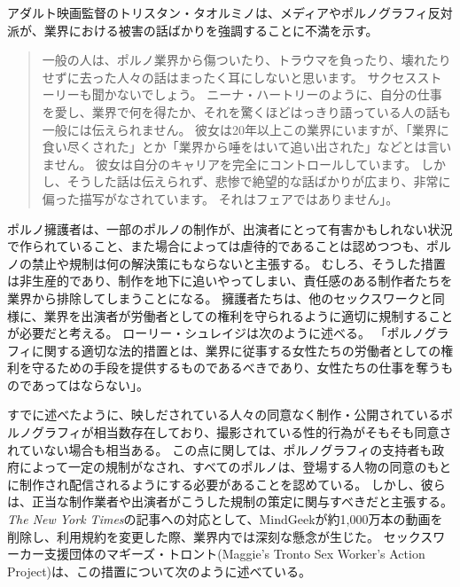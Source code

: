 \documentclass[paper=a4,book,openany]{jlreq}
\begin{document}
アダルト映画監督のトリスタン・タオルミノは、メディアやポルノグラフィ反対派が、業界における被害の話ばかりを強調することに不満を示す。

\begin{quote}
一般の人は、ポルノ業界から傷ついたり、トラウマを負ったり、壊れたりせずに去った人々の話はまったく耳にしないと思います。
サクセスストーリーも聞かないでしょう。
ニーナ・ハートリーのように、自分の仕事を愛し、業界で何を得たか、それを驚くほどはっきり語っている人の話も一般には伝えられません。
彼女は20年以上この業界にいますが、「業界に食い尽くされた」とか「業界から唾をはいて追い出された」などとは言いません。
彼女は自分のキャリアを完全にコントロールしています。
しかし、そうした話は伝えられず、悲惨で絶望的な話ばかりが広まり、非常に偏った描写がなされています。
それはフェアではありません」。
\citep{sachs12:_inter_femin_pornog}
\end{quote}

ポルノ擁護者は、一部のポルノの制作が、出演者にとって有害かもしれない状況で作られていること、また場合によっては虐待的であることは認めつつも、ポルノの禁止や規制は何の解決策にもならないと主張する。
むしろ、そうした措置は非生産的であり、制作を地下に追いやってしまい、責任感のある制作者たちを業界から排除してしまうことになる。
擁護者たちは、他のセックスワークと同様に、業界を出演者が労働者としての権利を守られるように適切に規制することが必要だと考える。
ローリー・シュレイジは次のように述べる。
「ポルノグラフィに関する適切な法的措置とは、業界に従事する女性たちの労働者としての権利を守るための手段を提供するものであるべきであり、女性たちの仕事を奪うものであってはならない」\citep[p.58]{shrage05:_expos_fallac_anti_femin}。

すでに述べたように、映しだされている人々の同意なく制作・公開されているポルノグラフィが相当数存在しており、撮影されている性的行為がそもそも同意されていない場合も相当ある。
この点に関しては、ポルノグラフィの支持者も政府によって一定の規制がなされ、すべてのポルノは、登場する人物の同意のもとに制作され配信されるようにする必要があることを認めている。
しかし、彼らは、正当な制作業者や出演者がこうした規制の策定に関与すべきだと主張する。
\emph{The New York Times}の記事への対応として、MindGeekが約1,000万本の動画を削除し、利用規約を変更した際、業界内では深刻な懸念が生じた。
セックスワーカー支援団体のマギーズ・トロント(Maggie's Tronto Sex Worker's Action Project)は、この措置について次のように述べている。
\end{document}
